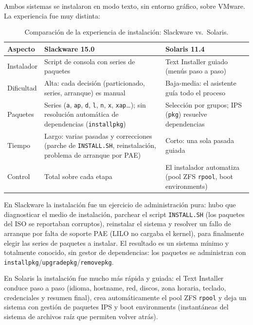 \documentclass[11pt,a4paper]{report}
\begin{document}
Ambos sistemas se instalaron en modo texto, sin entorno gráfico, sobre VMware. La experiencia fue muy distinta:

\begin{table}[H]
  \centering
  \footnotesize
  \begin{tabularx}{\linewidth}{@{}p{2.6cm}XX@{}}
    \toprule
    \textbf{Aspecto} & \textbf{Slackware 15.0} & \textbf{Solaris 11.4} \\
    \midrule
    Instalador & Script de consola con series de paquetes & Text Installer guiado (menús paso a paso) \\
    Dificultad & Alta: cada decisión (particionado, series, arranque) es manual & Baja-media: el asistente guía todo el proceso \\
    Paquetes & Series (\texttt{a}, \texttt{ap}, \texttt{d}, \texttt{l}, \texttt{n}, \texttt{x}, \texttt{xap}\ldots); sin resolución automática de dependencias (\texttt{installpkg}) & Selección por grupos; IPS (\texttt{pkg}) resuelve dependencias \\
    Tiempo & Largo: varias pasadas y correcciones (parche de \texttt{INSTALL.SH}, reinstalación, problema de arranque por PAE) & Corto: una sola pasada guiada \\
    Control & Total sobre cada etapa & El instalador automatiza (pool ZFS \texttt{rpool}, boot environments) \\
    \bottomrule
  \end{tabularx}
  \caption{Comparación de la experiencia de instalación: Slackware vs.\ Solaris.}
  \label{tab:cmp-instalacion}
\end{table}

En Slackware la instalación fue un ejercicio de administración pura: hubo que diagnosticar el medio de instalación, parchear el script \texttt{INSTALL.SH} (los paquetes del ISO se reportaban corruptos), reinstalar el sistema y resolver un fallo de arranque por falta de soporte PAE (LILO no cargaba el kernel), para finalmente elegir las series de paquetes a instalar. El resultado es un sistema mínimo y totalmente conocido, sin gestor de dependencias: los paquetes se administran con \texttt{installpkg}/\texttt{upgradepkg}/\texttt{removepkg}.

En Solaris la instalación fue mucho más rápida y guiada: el Text Installer conduce paso a paso (idioma, hostname, red, discos, zona horaria, teclado, credenciales y resumen final), crea automáticamente el pool ZFS \texttt{rpool} y deja un sistema con gestión de paquetes IPS y boot environments (instantáneas del sistema de archivos raíz que permiten volver atrás).
\end{document}
